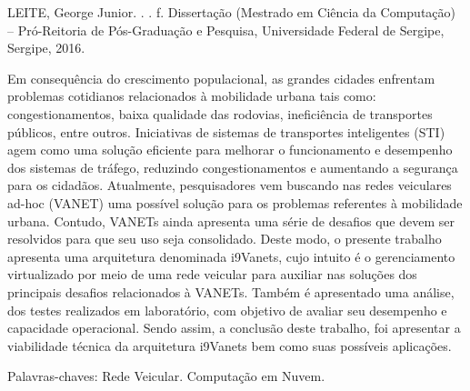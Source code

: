 \documentclass[
	12pt,				%
	oneside,			%
	a4paper,			%
	english,			%
	brazil				%
	]{abntex2ppgsi}
\begin{document}
\setlength{\absparsep}{18pt} %
\begin{resumo}

% 
%
% 
%
\begin{flushleft}
LEITE, George Junior. \textbf{\imprimirtitulo}. \imprimirdata. \pageref{LastPage} f. Dissertação (Mestrado em Ciência da Computação) – Pró-Reitoria de Pós-Graduação e Pesquisa, Universidade Federal de Sergipe, Sergipe, 2016.
\end{flushleft}

Em consequência do crescimento populacional, as grandes cidades enfrentam problemas cotidianos relacionados à mobilidade urbana tais como: congestionamentos, baixa qualidade das rodovias, ineficiência de transportes públicos, entre outros. Iniciativas de sistemas de transportes inteligentes (STI) agem como uma solução eficiente para melhorar o funcionamento e desempenho dos sistemas de tráfego, reduzindo congestionamentos e aumentando a segurança para os cidadãos. Atualmente, pesquisadores vem buscando nas redes veiculares ad-hoc (VANET) uma possível solução para os problemas referentes à mobilidade urbana. Contudo, VANETs ainda apresenta uma série de desafios que devem ser resolvidos para que seu uso seja consolidado.  Deste modo, o presente trabalho apresenta uma arquitetura denominada i9Vanets, cujo intuito é o gerenciamento virtualizado por meio de uma rede veicular para auxiliar nas soluções dos principais desafios relacionados à VANETs. Também é apresentado uma análise, dos testes realizados em laboratório, com objetivo de avaliar seu desempenho e capacidade operacional. Sendo assim, a conclusão deste trabalho, foi apresentar a viabilidade técnica da arquitetura i9Vanets bem como suas possíveis aplicações.


Palavras-chaves: Rede Veicular. Computação em Nuvem.
\end{resumo}
\end{document}
